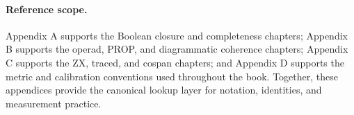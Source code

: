 \paragraph{Reference scope.} Appendix A supports the Boolean closure and completeness chapters; Appendix B supports the operad, PROP, and diagrammatic coherence chapters; Appendix C supports the ZX, traced, and cospan chapters; and Appendix D supports the metric and calibration conventions used throughout the book. Together, these appendices provide the canonical lookup layer for notation, identities, and measurement practice.
